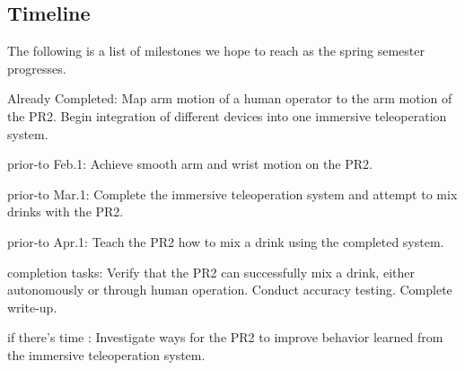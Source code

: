 \documentclass{sig-alternate}
\begin{document}
\subsection{Timeline}
The following is a list of milestones we hope to reach as the spring semester progresses.
\begin{itemize*}
        \item {\sc Already Completed}: Map arm motion of a human operator to the arm motion of the PR2. Begin integration
          of different devices into one immersive teleoperation system.\vspace{3pt}
	\item {\sc prior-to Feb.1}: Achieve smooth arm and wrist motion on the PR2.\vspace{3pt}
	\item {\sc prior-to Mar.1}: Complete the immersive teleoperation system and attempt to mix drinks with the PR2.\vspace{3pt}
	\item {\sc prior-to Apr.1}: Teach the PR2 how to mix a drink using the completed system.\vspace{3pt}
	\item {\sc completion tasks}: Verify that the PR2 can successfully mix a drink, either autonomously or through human operation. Conduct accuracy testing. Complete write-up.\vspace{3pt}
	\item {\sc if there's time} : Investigate ways for the PR2 to improve behavior learned from the immersive teleoperation system.
\end{itemize*}

\end{document}
